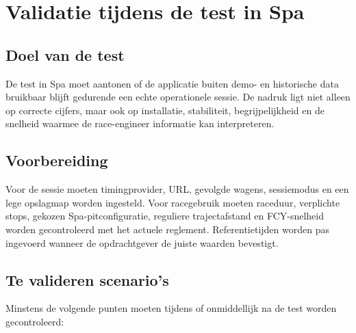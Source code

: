 \chapter{Validatie tijdens de test in Spa}
\label{chap:spa}


\section{Doel van de test}
De test in Spa moet aantonen of de applicatie buiten demo- en historische data bruikbaar blijft gedurende een echte operationele sessie. De nadruk ligt niet alleen op correcte cijfers, maar ook op installatie, stabiliteit, begrijpelijkheid en de snelheid waarmee de race-engineer informatie kan interpreteren.

\section{Voorbereiding}
Voor de sessie moeten timingprovider, URL, gevolgde wagens, sessiemodus en een lege opslagmap worden ingesteld. Voor racegebruik moeten raceduur, verplichte stops, gekozen Spa-pitconfiguratie, reguliere trajectafstand en FCY-snelheid worden gecontroleerd met het actuele reglement. Referentietijden worden pas ingevoerd wanneer de opdrachtgever de juiste waarden bevestigt.


\section{Te valideren scenario's}
Minstens de volgende punten moeten tijdens of onmiddellijk na de test worden gecontroleerd:

